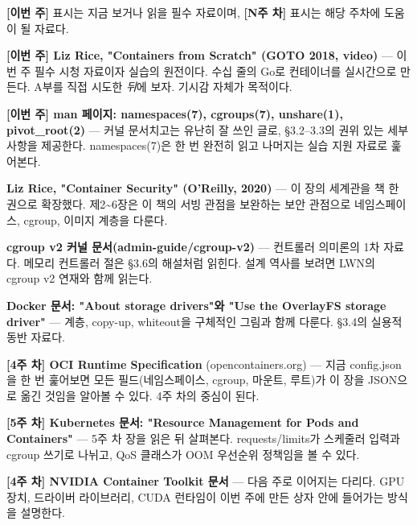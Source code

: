 

\textbf{[이번 주]} 표시는 지금 보거나 읽을 필수 자료이며, \textbf{[N주 차]} 표시는 해당 주차에 도움이 될 자료다.

\begin{tbbitemize}
  \item \textbf{[이번 주] Liz Rice, "Containers from Scratch" (GOTO 2018, video)} — 이번 주 필수 시청 자료이자 실습의 원전이다. 수십 줄의 Go로 컨테이너를 실시간으로 만든다. A부를 직접 시도한 \textit{뒤}에 보자. 기시감 자체가 목적이다.
  \item \textbf{[이번 주] man 페이지: namespaces(7), cgroups(7), unshare(1), pivot\_root(2)} — 커널 문서치고는 유난히 잘 쓰인 글로, §3.2–3.3의 권위 있는 세부 사항을 제공한다. namespaces(7)은 한 번 완전히 읽고 나머지는 실습 지원 자료로 훑어본다.
  \item \textbf{Liz Rice, "Container Security" (O'Reilly, 2020)} — 이 장의 세계관을 책 한 권으로 확장했다. 제2\textasciitilde{}6장은 이 책의 서빙 관점을 보완하는 보안 관점으로 네임스페이스, cgroup, 이미지 계층을 다룬다.
  \item \textbf{cgroup v2 커널 문서(admin-guide/cgroup-v2)} — 컨트롤러 의미론의 1차 자료다. 메모리 컨트롤러 절은 §3.6의 해설처럼 읽힌다. 설계 역사를 보려면 LWN의 cgroup v2 연재와 함께 읽는다.
  \item \textbf{Docker 문서: "About storage drivers"와 "Use the OverlayFS storage driver"} — 계층, copy-up, whiteout을 구체적인 그림과 함께 다룬다. §3.4의 실용적 동반 자료다.
  \item \textbf{[4주 차] OCI Runtime Specification} (opencontainers.org) — 지금 config.json을 한 번 훑어보면 모든 필드(네임스페이스, cgroup, 마운트, 루트)가 이 장을 JSON으로 옮긴 것임을 알아볼 수 있다. 4주 차의 중심이 된다.
  \item \textbf{[5주 차] Kubernetes 문서: "Resource Management for Pods and Containers"} — 5주 차 장을 읽은 뒤 살펴본다. requests/limits가 스케줄러 입력과 cgroup 쓰기로 나뉘고, QoS 클래스가 OOM 우선순위 정책임을 볼 수 있다.
  \item \textbf{[4주 차] NVIDIA Container Toolkit 문서} — 다음 주로 이어지는 다리다. GPU 장치, 드라이버 라이브러리, CUDA 런타임이 이번 주에 만든 상자 안에 들어가는 방식을 설명한다.
\end{tbbitemize}

